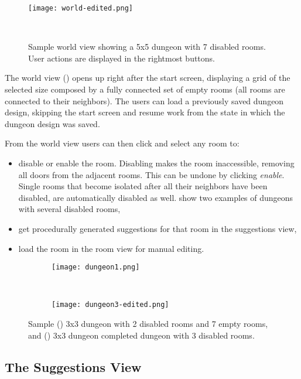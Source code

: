 \documentclass[sigconf]{acmart}
\begin{document}
\begin{figure}[t]
    \centering
    \texttt{[image: world-edited.png]}
    \caption{Sample world view showing a 5x5 dungeon with 7 disabled rooms. User actions are displayed in the rightmost buttons.}~\label{fig:world}
\end{figure}

The world view () opens up right after the start screen, displaying a grid of the selected size composed by a fully connected set of empty rooms (all rooms are connected to their neighbors). The users can load a previously saved dungeon design, skipping the start screen and resume work from the state in which the dungeon design was saved.

From the world view users can then click and select any room to:
\begin{itemize}
\item disable or enable the room. Disabling makes the room inaccessible, removing all doors from the adjacent rooms. This can be undone by clicking \emph{enable}. Single rooms that become isolated after all their neighbors have been disabled, are automatically disabled as well.  show two examples of dungeons with several disabled rooms,
\item get procedurally generated suggestions for that room in the suggestions view,
\item load the room in the room view for manual editing.
\end{itemize}

\begin{figure}[ht]
  \centering
  \begin{subfigure}[b]{0.49\linewidth}
    \centering\texttt{[image: dungeon1.png]}
    \caption{\label{fig:dungeon1}}
  \end{subfigure}%
  ~
  \begin{subfigure}[b]{0.49\linewidth}
    \centering\texttt{[image: dungeon3-edited.png]}
    \caption{\label{fig:dungeon2}}
  \end{subfigure}
  \caption{Sample () 3x3 dungeon with 2 disabled rooms and 7 empty rooms, and () 3x3 dungeon completed dungeon with 3 disabled rooms.}
\end{figure}

\subsection{The Suggestions View}
\end{document}
